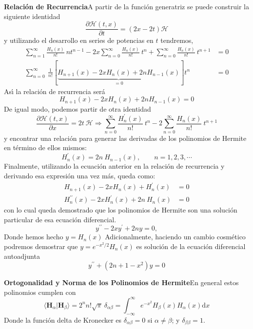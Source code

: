 \documentclass[spanish,notitlepage,letterpaper,12pt]{article}
\begin{document}
\textbf{Relaci\'{o}n de Recurrencia}\newline A partir de la funci\'{o}n
generatriz se puede construir la siguiente identidad
\[
\frac{\partial\mathcal{H}(t,x)}{\partial t}=\left(  2x-2t\right)  \mathcal{H}
\]
y utilizando el desarrollo en series de potencias en $t$ tendremos,
\begin{align*}
\sum_{n=1}^{\infty}\frac{H_{n}(x)}{n!}\ nt^{n-1}-2x\sum_{n=0}^{\infty}%
\frac{H_{n}(x)}{n!}\ t^{n}+\sum_{n=0}^{\infty}\frac{H_{n}(x)}{n!}\ t^{n+1}  &
=0\\
\sum_{n=0}^{\infty}\ \frac1{n!}\left[  \underbrace{H_{n+1}(x)-2xH_{n}%
(x)+2nH_{n-1}(x)}_{=0}\right]  t^{n}  & =0
\end{align*}
As\'{\i} la relaci\'{o}n de recurrencia ser\'{a}
\[
H_{n+1}(x)-2xH_{n}(x)+2nH_{n-1}(x)=0
\]
De igual modo, podemos partir de otra identidad
\[
\frac{\partial\mathcal{H}(t,x)}{\partial x}=2t\ \mathcal{H}\Rightarrow
\sum_{n=0}^{\infty}\frac{H_{n}^{\prime}(x)}{n!}\ t^{n}-2\sum_{n=0}^{\infty
}\frac{H_{n}(x)}{n!}\ t^{n+1}
\]
y encontrar una relaci\'{o}n para generar las derivadas de los polinomios de
Hermite en t\'{e}rmino de ellos mismos:
\[
H_{n}^{\prime}(x)=2n\ H_{n-1}(x),\qquad n=1,2,3,\cdots
\]
Finalmente, utilizando la ecuaci\'{o}n anterior en la relaci\'{o}n de
recurrencia y derivando esa expresi\'{o}n una vez m\'{a}s, queda como:
\begin{align*}
H_{n+1}(x)-2xH_{n}(x)+H_{n}^{\prime}(x)  & =0\\
H_{n}^{\prime\prime}(x)-2xH_{n}^{\prime}(x)+2n\ H_{n}(x)  & =0
\end{align*}
con lo cual queda demostrado que los polinomios de Hermite son una
soluci\'{o}n particular de esa ecuaci\'{o}n diferencial.
\[
y^{\prime\prime}-2xy^{\prime}+2ny=0,
\]
Donde hemos hecho $y=H_{n}(x)$ Adicionalmente, haciendo un cambio
cosm\'{e}tico podremos demostrar que $y=e^{-x^{2}/2}H_{n}(x)$ es soluci\'{o}n
de la ecuaci\'{o}n diferencial autoadjunta
\[
y^{\prime\prime}+\left(  2n+1-x^{2}\right)  y=0
\]

\textbf{Ortogonalidad y Norma de los Polinomios de Hermite}\newline En general
estos polinomios cumplen con
\[
\langle\mathbf{H}_{\alpha}|\mathbf{H}_{\beta}\rangle=2^{n}n!\sqrt{\pi}%
\ \delta_{\alpha\beta}=\int_{-\infty}^{\infty}e^{-x^{2}}H_{\beta}(x)H_{\alpha
}(x)\mathrm{d}x
\]
Donde la funci\'{o}n delta de Kronecker es $\delta_{\alpha\beta}=0$ si
$\alpha\neq\beta$; y $\delta_{\beta\beta}=1.$
\end{document}
